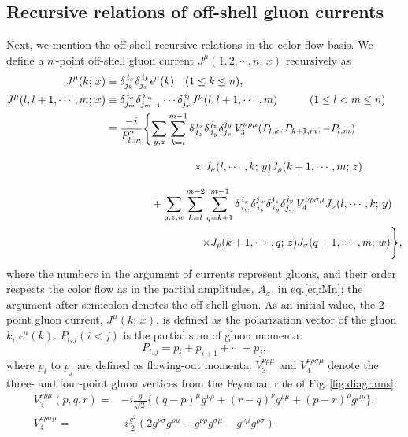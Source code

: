 \documentclass[a4paper,11pt]{article}
\begin{document}
\subsection{Recursive relations of off-shell gluon currents}
Next, we mention the off-shell recursive relations in the color-flow
basis. We define a $n$\,-point off-shell gluon current $J^{\mu}(1, 2,\cdots,n;\,x)$ recursively
as
\begin{align}
J^{\mu}(k;\,x)&\equiv\delta_{j_k}^{\,i_x}\delta_{j_x}^{\,i_k}\epsilon^{\mu}(k)\hspace{1em}(1\leq
 k\leq n),\label{j2}\\
J^{\mu}(l, l+1,\cdots,m;\,x)&\equiv\delta^{\,i_x}_{j_m}\delta^{\,i_m}_{j_{m-1}}\cdots\delta^{\,i_{l}}_{j_x}J^{\mu}(l, l+1,\cdots,m)\hspace{3em} (1\leq l < m\leq n)\nonumber\\
&\equiv\frac{-i}{P^2_{l, m}}\Biggl\{\sum_{y, z}\sum_{k=l}^{m-1}
\delta_{\,i_z}^{\,i_x}\delta_{\,i_y}^{j_z}\delta_{j_x}^{j_y}\,V^{\nu\rho\mu}_3(P_{l, k},P_{k+1, m},-P_{l, m})\nonumber\\
 &\hspace{8em}\times J_{\nu}
(l,\cdots,k;\,y)J_{\rho}(k+1,\cdots,m;\,z)\Biggr.\nonumber\\
&\hspace{4.2em}+\sum_{y, z, w}\sum_{k=l}^{m-2}\sum_{q=k+1}^{m-1}
\delta_{\,i_w}^{\,i_x}\delta_{\,i_z}^{j_w}\delta_{\,i_y}^{j_z}\delta_{j_x}^{j_y}
 \,V^{\nu\rho\sigma\mu}_4J_{\nu}(l, \cdots,k;\,y)\nonumber\\
 &\hspace{9em}\Biggl.\times J_{\rho}(k+1,\cdots,q;\,z)J_{\sigma}(q+1,\cdots,m;\,w)\Biggr\},
\label{eq:off-shell}
\end{align}
where the numbers in the argument of currents represent gluons,
 and their order respects the color flow as in the partial amplitudes,
 $A_{\sigma}$, in eq.\eqref{eq:Mn}; the argument after semicolon denotes the off-shell gluon. As an initial value, the 2-point gluon current,
 $J^{\mu}(k;\,x)$, is defined as the polarization vector of the gluon $k$,
 $\epsilon^{\mu}(k)$. $P_{i,j} (i<j)$ is the partial sum
 of gluon momenta:
 \begin{equation}
P_{i,j}=p_i+p_{i+1}+\cdots+p_j,
 \end{equation}
where $p_i$ to $p_j$ are defined as
 flowing-out momenta.
$V_3^{\nu\rho\mu}$ and $V_4^{\nu\rho\sigma\mu}$ denote the three- and
 four-point gluon vertices from the Feynman rule of Fig.\,\ref{fig:diagrams}:
\begin{align}
V_3^{\nu\rho\mu}(p,q,r)=&-i\frac{g}{\sqrt{2}}\bigl\{(q-p)^{\mu}g^{\nu\rho}+(r-q)^{\nu}g^{\rho\mu}+(p-r)^{\rho}g^{\mu\nu}\bigr\},\\
V_4^{\nu\rho\sigma\mu}=&\,\,i\frac{g^2}{2}(2g^{\nu\sigma}g^{\rho\mu}-g^{\nu\rho}g^{\sigma\mu}-g^{\nu\mu}g^{\rho\sigma}).
\end{align}
\end{document}
